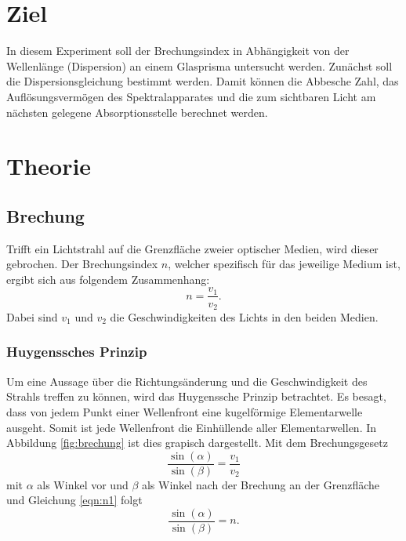 \section{Ziel}
\label{sec:Ziel}
In diesem Experiment soll der Brechungsindex in Abhängigkeit von der Wellenlänge (Dispersion) an einem Glasprisma untersucht werden. Zunächst soll die Dispersionsgleichung bestimmt werden. Damit können die Abbesche Zahl, das Auflösungsvermögen des Spektralapparates und die zum sichtbaren Licht am nächsten gelegene Absorptionsstelle berechnet werden.

\section{Theorie}
\label{sec:theorie}
\subsection{Brechung}
Trifft ein Lichtstrahl auf die Grenzfläche zweier optischer Medien, wird dieser gebrochen. Der Brechungsindex $n$, welcher spezifisch für das jeweilige Medium ist, ergibt sich aus folgendem Zusammenhang:
\begin{equation}
  \label{eqn:n1}
  n=\frac{v_1}{v_2}.
\end{equation}
Dabei sind $v_1$ und $v_2$ die Geschwindigkeiten des Lichts in den beiden Medien.

\subsubsection{Huygenssches Prinzip}
Um eine Aussage über die Richtungsänderung und die Geschwindigkeit des Strahls treffen zu können, wird das Huygenssche Prinzip betrachtet. Es besagt, dass von jedem Punkt einer Wellenfront eine kugelförmige Elementarwelle ausgeht. Somit ist jede Wellenfront die Einhüllende aller Elementarwellen. In Abbildung \ref{fig:brechung} ist dies grapisch dargestellt. Mit dem Brechungsgesetz
\begin{equation}
  \frac{\sin(\alpha)}{\sin(\beta)} =\frac{v_1}{v_2}
\end{equation}
mit $\alpha$ als Winkel vor und $\beta$ als Winkel nach der Brechung an der Grenzfläche und Gleichung \ref{eqn:n1} folgt
\begin{equation}
  \frac{\sin(\alpha)}{\sin(\beta)} = n.
\end{equation}

